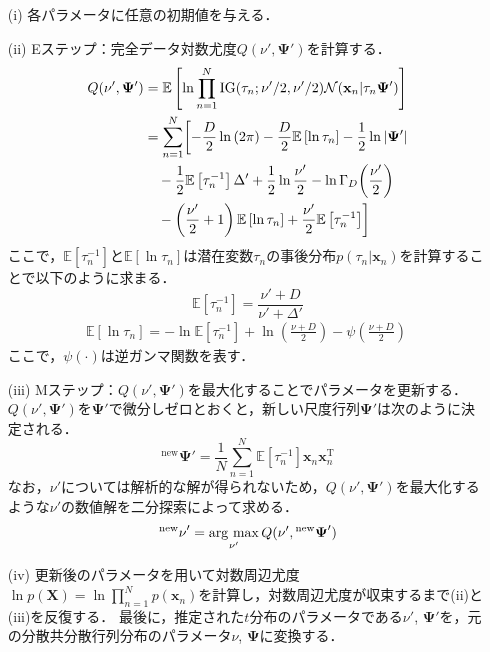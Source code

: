 \documentclass[journal]{IEEEtran}
\newcommand{\argmax}{\mathop{\rm arg\ max}\limits}
\begin{document}
\begin{enumerate}
\setlength{\parskip}{0cm} %
\setlength{\itemsep}{0cm} %
\item[(i)] 各パラメータに任意の初期値を与える．
\item[(ii)] Eステップ：完全データ対数尤度$Q(\nu',\bm \Psi')$を計算する．
\begin{align}%
  Q(\nu',\bm{\Psi}')&=\mathbb{E} \left[\ln{\prod_{n=1}^{N}\mathrm{IG}(\tau_n;\nu'/2,\nu'/2) \mathcal{N}(\mathbf{x}_n|\tau_n \bm{\Psi}')}\right]  \notag  \\
  &=\sum_{n=1}^{N} \biggl[-\frac{D}{2}\ln{(2\pi)}-\frac{D}{2}\mathbb{E}\left[\ln{\tau_n}\right]-\frac{1}{2}\ln{|\bm \Psi'|} \notag \\
  &\quad-\frac{1}{2}\mathbb{E}\left[\tau^{-1}_n\right]\Delta'+\frac{1}{2} \ln{\frac{\nu'}{2}} - \ln{\Gamma_D{\left(\frac{\nu'}{2}\right)}} \notag \\
  &\quad- \left(\frac{\nu'}{2}+1\right)\mathbb{E}\left[\ln{\tau_n}\right]+\frac{\nu'}{2}\mathbb{E}\left[\tau^{-1}_n \right] \biggr]
\end{align}
ここで，$\mathbb{E}\left[\tau^{-1}_n\right]$と$\mathbb{E}\left[\ln{\tau_n}\right]$は潜在変数$\tau_n$の事後分布$p(\tau_n|\mathbf{x}_n)$を計算することで以下のように求まる．
\begin{equation}%
\mathbb{E}\left[\tau^{-1}_n\right]=\frac{\nu'+D}{\nu'+\Delta'}
\end{equation}
\begin{eqnarray}%
&\mathbb{E}\left[\ln{\tau_n}\right]=-\ln{\mathbb{E}\left[\tau^{-1}_n\right]}+\ln{\left(\frac{\nu+D}{2}\right)}-{\psi}\left(\frac{\nu+D}{2}\right)\quad
\end{eqnarray}
ここで，$\psi(\cdot)$は逆ガンマ関数を表す．
\item[(iii)] Mステップ：$Q(\nu', \bm \Psi')$を最大化することでパラメータを更新する．$Q(\nu', \bm \Psi')$を$\bm \Psi'$で微分しゼロとおくと，新しい尺度行列$\bm \Psi'$は次のように決定される．
\begin{equation}%
{^\mathrm{new} {\bm \Psi}}' = \frac{1}{N} \sum_{n=1}^{N} \mathbb{E}\left[\tau^{-1}_n\right] \mathbf{x}_n \mathbf{x}_n^\mathrm{T}
\end{equation}
なお，$\nu'$については解析的な解が得られないため，$Q(\nu', \bm \Psi')$を最大化するような$\nu'$の数値解を二分探索によって求める．
\begin{equation}%
{^\mathrm{new} \nu}' = \argmax_{\nu'}  Q(\nu', {^\mathrm{new} {\bm \Psi}}')
\end{equation}
\item[(iv)] 更新後のパラメータを用いて対数周辺尤度$\ln{p(\mathbf{X})} = \ln{\prod_{n=1}^N p(\mathbf{x}_n)}$を計算し，対数周辺尤度が収束するまで(ii)と(iii)を反復する．
最後に，推定された$t$分布のパラメータである$\nu'$, $\bm \Psi'$を，元の分散共分散行列分布のパラメータ$\nu$, $\bm \Psi$に変換する．
\end{enumerate}
\end{document}
